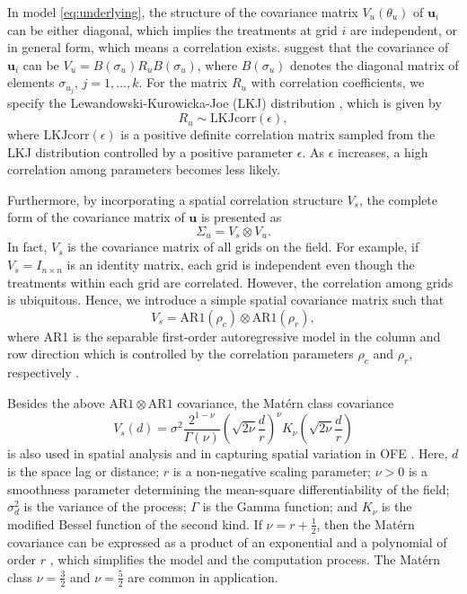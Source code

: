 \documentclass[a4paper]{article} 	%
\newcommand{\Matern}{Mat\'ern }
\newcommand{\AR}{\mathrm{AR1}}
\begin{document}
In model \eqref{eq:underlying}, the structure of the covariance matrix $V_u(\theta_u)$ of $\bm{u}_i$ can be either diagonal, which implies the treatments at grid $i$ are independent, or in general form, which means a correlation exists. \textcite{McElreath2015Statistical} suggest that the covariance of $\bm{u}_i$ can be $V_u = B(\sigma_u)R_uB(\sigma_u)$, where $B(\sigma_u)$ denotes the diagonal matrix of elements $\sigma_{u_j}$, $j=1,\ldots,k$. For the matrix $R_u$ with correlation coefficients, we specify the Lewandowski-Kurowicka-Joe (LKJ) distribution \parencite{Lewandowski2009Generating}, which is given by
\begin{equation}\label{eq:RPrior}
    R_u \sim \text{LKJcorr}(\epsilon),
\end{equation}
where $\text{LKJcorr}(\epsilon)$ is a positive definite correlation matrix sampled from the LKJ distribution controlled by a positive parameter $\epsilon$. As $\epsilon$ increases, a high correlation among parameters becomes less likely. 


Furthermore, by incorporating a spatial correlation structure $V_s$, the complete form of the covariance matrix of $\bm{u}$ is presented as 
\begin{equation}\label{eq:varu}
	\Sigma_u = V_s \otimes V_u. 
\end{equation}
In fact, $V_s$ is the covariance matrix of all grids on the field. For example, if $V_s=I_{n\times n}$ is an identity matrix, each grid is independent even though the treatments within each grid are correlated. However, the correlation among grids is ubiquitous. Hence, we introduce a simple spatial covariance matrix such that 
\begin{equation}\label{eq:ar1cov}
	V_s = \AR(\rho_c)\otimes \AR(\rho_r),
\end{equation}
where AR1 is the separable first-order autoregressive model in the column and row direction which is controlled by the correlation parameters $\rho_c$ and $\rho_r$, respectively \parencite{Butler2017ASRemlR}. 

Besides the above $\AR\otimes\AR$ covariance, the \Matern class covariance  
\begin{equation}\label{eq:matcov}
V_s(d) = \sigma^2 \frac{2^{1-\nu}}{\Gamma(\nu)} \left( \sqrt{2\nu} \frac{d}{r}\right)^\nu K_\nu\left( \sqrt{2\nu} \frac{d}{r}\right)
\end{equation}
is also used in spatial analysis \parencite{Cressie1999Classes} and in capturing spatial variation in OFE \parencite{Selle2019Flexible}. Here, $d$ is the space lag or distance; $r$ is a non-negative scaling parameter; $\nu> 0$ is a smoothness parameter determining the mean-square differentiability of the field; $\sigma_d^2$ is the variance of the process; $\Gamma$ is the Gamma function; and $K_\nu$ is the modified Bessel function of the second kind. If $\nu = r + \frac{1}{2}$, then the \Matern covariance can be expressed as a product of an exponential and a polynomial of order $r$ \parencite{Pandit2019Comparative, Abramowitz1974Handbook}, which simplifies the model and the computation process. The \Matern class $\nu=\frac{3}{2}$ and $\nu =\frac{5}{2}$ are common in application. 
\end{document}
